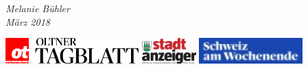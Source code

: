 \begin{titlepage}
  \setlength{\fboxsep}{50pt}
  \setlength{\fboxrule}{3pt}

  \vfill
  \vfill

  \begin{minipage}{\textwidth}
    \begin{center}
      \vspace*{4cm}
    \end{center}
  \end{minipage}

  \vfill

  \begin{minipage}{\textwidth}
    \begin{center}
      \Large{\textit{Melanie Bühler}}\\
      \Large{\textit{März 2018}}\\
    \end{center}
  \end{minipage}

  \vfill

  \begin{minipage}{\textwidth}
    \begin{center}
      \includegraphics[height=1cm]{Bilder/Logo/Oltnertagblatt[1].jpg}
      \quad
      \includegraphics[height=1cm]{Bilder/Logo/5658_2_Stadtanzeiger_Olten_Schrift[1].jpg}
      \quad
      \includegraphics[height=1cm]{Bilder/Logo/18021_2_SaW_Logo_V2_cmyk[1].jpg}
    \end{center}
  \end{minipage}

\end{titlepage}
\newpage
